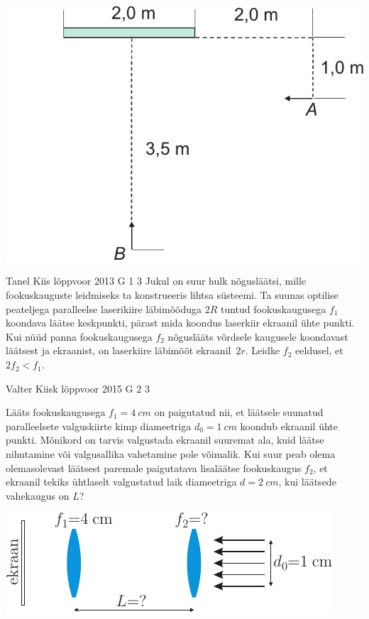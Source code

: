\documentclass[11pt]{article}
\begin{document}
{{\begin{center}
\includegraphics[width=0.5\linewidth]{2012-v2g-01-peegel2}%
\end{center}
\fi
}

{Tanel Kiis} %
{lõppvoor} %
{2013} %
{G 1} %
{3} %
{
\ifStatement
Jukul on suur hulk nõgusläätsi, mille fookuskauguste leidmiseks ta konstrueeris lihtsa
süsteemi. Ta suunas optilise peateljega paralleelse
laserikiire läbimõõduga $2R$ tuntud fookuskaugusega
$f_1$ koondava läätse keskpunkti, pärast mida koondus laserkiir ekraanil ühte punkti. Kui nüüd panna
fookuskaugusega $f_2$ nõguslääts võrdsele kaugusele koondavast läätsest ja
ekraanist, on laserkiire läbimõõt ekraanil~$2r$. Leidke $f_2$ eeldusel, et~$2f_2 < f_1$.
\fi
}

{Valter Kiisk} %
{lõppvoor} %
{2015} %
{G 2} %
{3} %
{
\ifStatement
Lääts fookuskaugusega $f_1=\SI{4}{cm}$ on paigutatud nii, et läätsele suunatud paralleelsete valguskiirte kimp diameetriga $d_0=\SI{1}{cm}$ koondub ekraanil ühte punkti. Mõnikord on tarvis valgustada ekraanil suuremat ala, kuid läätse nihutamine või valgusallika vahetamine pole võimalik. Kui suur peab olema olemasolevast läätsest paremale paigutatava lisaläätse fookuskaugus $f_2$, et ekraanil tekiks ühtlaselt valgustatud laik diameetriga $d=\SI{2}{cm}$, kui läätsede vahekaugus on $L$?
\begin{center}
\includegraphics[scale=1.5]{2015-v3g-02-valgustamine-yles}
\end{center}
\fi
}

}
\end{document}
